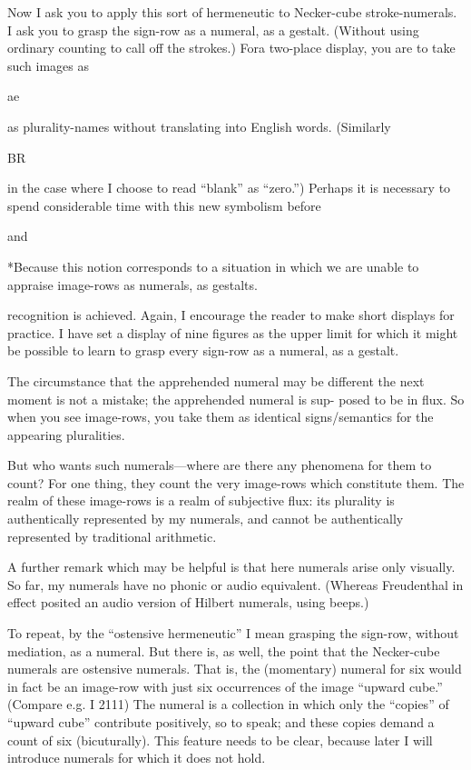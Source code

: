 Now I ask you to apply this sort of hermeneutic to Necker-cube 
stroke-numerals. I ask you to grasp the sign-row as a numeral, as a 
gestalt. (Without using ordinary counting to call off the strokes.) Fora 
two-place display, you are to take such images as 


ae 


as plurality-names without translating into English words. (Similarly 


BR 


in the case where I choose to read “blank” as “zero.”) Perhaps it is 
necessary to spend considerable time with this new symbolism before 


and 


*Because this notion corresponds to a situation in which we are unable to 
appraise image-rows as numerals, as gestalts. 


recognition is achieved. Again, I encourage the reader to make short 
displays for practice. I have set a display of nine figures as the upper 
limit for which it might be possible to learn to grasp every sign-row as a 
numeral, as a gestalt. 

The circumstance that the apprehended numeral may be different 
the next moment is not a mistake; the apprehended numeral is sup- 
posed to be in flux. So when you see image-rows, you take them as 
identical signs/semantics for the appearing pluralities. 

But who wants such numerals—where are there any phenomena 
for them to count? For one thing, they count the very image-rows which 
constitute them. The realm of these image-rows is a realm of subjective 
flux: its plurality is authentically represented by my numerals, and 
cannot be authentically represented by traditional arithmetic. 

A further remark which may be helpful is that here numerals arise 
only visually. So far, my numerals have no phonic or audio equivalent. 
(Whereas Freudenthal in effect posited an audio version of Hilbert 
numerals, using beeps.) 

To repeat, by the “ostensive hermeneutic” I mean grasping the 
sign-row, without mediation, as a numeral. But there is, as well, the 
point that the Necker-cube numerals are ostensive numerals. That is, 
the (momentary) numeral for six would in fact be an image-row with 
just six occurrences of the image “upward cube.” (Compare e.g. 
I 2111) The numeral is a collection in which only the “copies” of 
“upward cube” contribute positively, so to speak; and these copies 
demand a count of six (bicuturally). This feature needs to be clear, 
because later I will introduce numerals for which it does not hold. 

